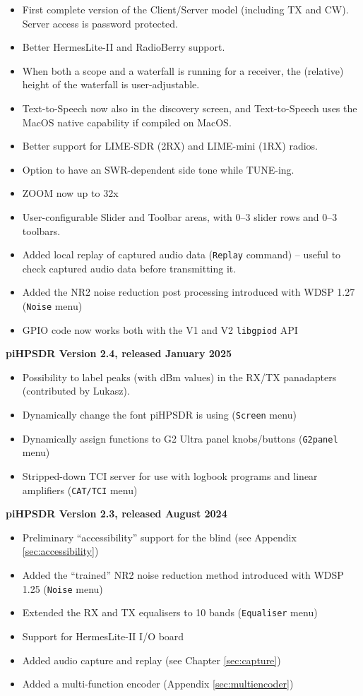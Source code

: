 \documentclass[12pt]{book}
\def\bltt#1{\texttt{\color{blue}#1}}
\def\pH{pi\-HPSDR\xspace}
\begin{document}
\begin{itemize}
\item{First complete version of the Client/Server model (including TX and CW).
Server access is password protected.}
\item{Better HermesLite-II and RadioBerry support.}
\item{When both a scope and a waterfall is running for a receiver, the (relative) height of
the waterfall is user-adjustable.}
\item{Text-to-Speech now also in the discovery screen, and Text-to-Speech uses the MacOS native
capability if compiled on MacOS.}
\item{Better support for LIME-SDR (2RX) and LIME-mini (1RX) radios.}
\item{Option to have an SWR-dependent side tone while TUNE-ing.}
\item{ZOOM now up to 32x}
\item{User-configurable Slider and Toolbar areas, with 0--3 slider rows and 0--3 toolbars.}
\item{Added local replay of captured audio data (\bltt{Replay} command) -- useful to check
captured audio data before transmitting it.}
\item{Added the NR2 noise reduction post processing introduced with WDSP 1.27 (\bltt{Noise} menu)}
\item{GPIO code now works both with the V1 and V2 \texttt{libgpiod} API}
\end{itemize}

\medskip
\textbf{\pH Version 2.4, released January 2025}
\begin{itemize}
\item{Possibility to label peaks (with dBm values) in the RX/TX panadapters (contributed
by Lukasz).}
\item{Dynamically change the font \pH is using (\bltt{Screen} menu)}
\item{Dynamically assign functions to G2 Ultra panel knobs/buttons (\bltt{G2panel} menu)}
\item{Stripped-down TCI server for use with logbook programs and linear amplifiers (\bltt{CAT/TCI} menu)}
\end{itemize}

\medskip
\textbf{\pH Version 2.3, released August 2024}
\begin{itemize}
\item{Preliminary ``accessibility'' support for the blind (see Appendix \ref{sec:accessibility})}
\item{Added the ``trained'' NR2 noise reduction method introduced with WDSP 1.25 (\bltt{Noise} menu)}
\item{Extended the RX and TX equalisers to 10 bands (\bltt{Equaliser} menu)}
\item{Support for HermesLite-II I/O board}
\item{Added audio capture and replay (see Chapter \ref{sec:capture})}
\item{Added a multi-function encoder (Appendix \ref{sec:multiencoder})}
\end{itemize}
\end{document}
